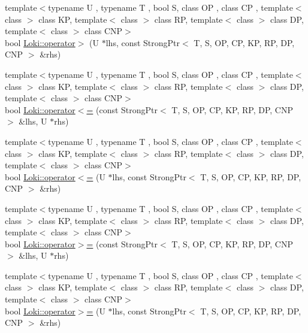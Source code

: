 \begin{DoxyCompactItemize}
\item 
{\footnotesize template$<$typename U , typename T , bool S, class O\+P , class C\+P , template$<$ class $>$ class K\+P, template$<$ class $>$ class R\+P, template$<$ class $>$ class D\+P, template$<$ class $>$ class C\+N\+P$>$ }\\bool \hyperlink{group__SmartPointerGroup_ga2e66dcb340f8be20d59c0bc25e31f847}{Loki\+::operator$>$} (U $\ast$lhs, const Strong\+Ptr$<$ T, S, O\+P, C\+P, K\+P, R\+P, D\+P, C\+N\+P $>$ \&rhs)
\item 
{\footnotesize template$<$typename U , typename T , bool S, class O\+P , class C\+P , template$<$ class $>$ class K\+P, template$<$ class $>$ class R\+P, template$<$ class $>$ class D\+P, template$<$ class $>$ class C\+N\+P$>$ }\\bool \hyperlink{group__SmartPointerGroup_ga1349a2ef1d4d18e0d825d1a22299c585}{Loki\+::operator$<$=} (const Strong\+Ptr$<$ T, S, O\+P, C\+P, K\+P, R\+P, D\+P, C\+N\+P $>$ \&lhs, U $\ast$rhs)
\item 
{\footnotesize template$<$typename U , typename T , bool S, class O\+P , class C\+P , template$<$ class $>$ class K\+P, template$<$ class $>$ class R\+P, template$<$ class $>$ class D\+P, template$<$ class $>$ class C\+N\+P$>$ }\\bool \hyperlink{group__SmartPointerGroup_ga79f9bc3cba5be737713e01278836071b}{Loki\+::operator$<$=} (U $\ast$lhs, const Strong\+Ptr$<$ T, S, O\+P, C\+P, K\+P, R\+P, D\+P, C\+N\+P $>$ \&rhs)
\item 
{\footnotesize template$<$typename U , typename T , bool S, class O\+P , class C\+P , template$<$ class $>$ class K\+P, template$<$ class $>$ class R\+P, template$<$ class $>$ class D\+P, template$<$ class $>$ class C\+N\+P$>$ }\\bool \hyperlink{group__SmartPointerGroup_gafff630dad25f2390bfddba4e494c18e1}{Loki\+::operator$>$=} (const Strong\+Ptr$<$ T, S, O\+P, C\+P, K\+P, R\+P, D\+P, C\+N\+P $>$ \&lhs, U $\ast$rhs)
\item 
{\footnotesize template$<$typename U , typename T , bool S, class O\+P , class C\+P , template$<$ class $>$ class K\+P, template$<$ class $>$ class R\+P, template$<$ class $>$ class D\+P, template$<$ class $>$ class C\+N\+P$>$ }\\bool \hyperlink{group__SmartPointerGroup_gaadaa4698c496d593d62e877aadf02580}{Loki\+::operator$>$=} (U $\ast$lhs, const Strong\+Ptr$<$ T, S, O\+P, C\+P, K\+P, R\+P, D\+P, C\+N\+P $>$ \&rhs)
\end{DoxyCompactItemize}


